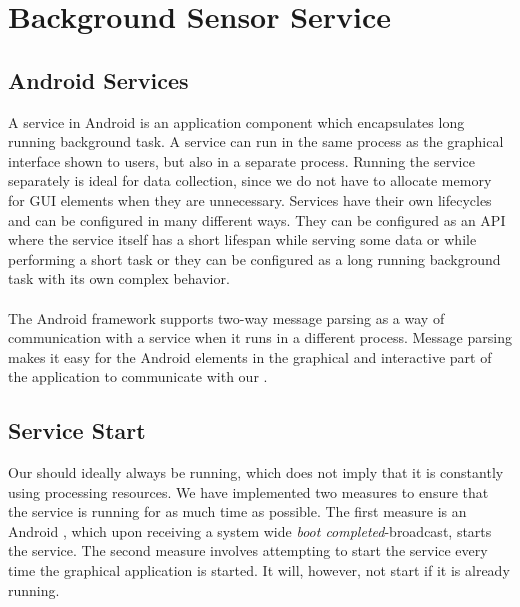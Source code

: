 
\section{Background Sensor Service}
\label{sec:background_sensor_service}


\subsection{Android Services}

A service in Android is an application component which encapsulates long running background task. A service can run in the same process as the graphical interface shown to users, but also in a separate process. Running the service separately is ideal for data collection, since we do not have to allocate memory for GUI elements when they are unnecessary. Services have their own lifecycles and can be configured in many different ways. They can be configured as an API where the service itself has a short lifespan while serving some data or while performing a short task or they can be configured as a long running background task with its own complex behavior.
\\\\
The Android framework supports two-way message parsing as a way of communication with a service when it runs in a different process. Message parsing makes it easy for the Android  elements in the graphical and interactive part of the application to communicate with our .

\subsection{Service Start}
Our  should ideally always be running, which does not imply that it is constantly using processing resources. We have implemented two measures to ensure that the service is running for as much time as possible. The first measure is an Android , which upon receiving a system wide \emph{boot completed}-broadcast, starts the service. The second measure involves attempting to start the service every time the graphical application is started. It will, however, not start if it is already running.

